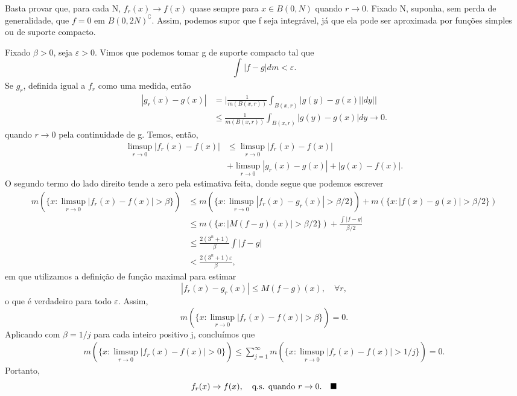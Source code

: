 \documentclass[MeasureTheory/measure_theory.tex]{subfiles}
\begin{document}
\begin{proof*}
	Basta provar que, para cada N, \(f_{r}(x)\to f(x)\) quase sempre para \(x\in B(0, N)\) quando \(r\to 0.\) Fixado N, suponha, sem perda de generalidade, que \(f = 0\) em \(B(0, 2N)^{\complement}\).
	Assim, podemos supor que f seja integrável, já que ela pode ser aproximada por funções simples ou de suporte compacto.

	Fixado \(\beta > 0\), seja \(\varepsilon > 0\). Vimos que podemos tomar g de suporte compacto tal que
	\[
		\int_{}|f-g| dm < \varepsilon .
	\]
	Se \(g_r\), definida igual a \(f_r\) como uma medida, então
	\begin{align*}
		|g_r(x) - g(x)| & = \biggl\vert \frac{1}{m(B(x, r))} \int_{B(x, r)}^{}|g(y) - g(x)||dy|\biggr\vert \\
		                & \leq \frac{1}{m(B(x, r))}\int_{B(x, r)}^{}|g(y)-g(x)|dy\to 0.
	\end{align*}
	quando \(r\to 0\) pela continuidade de g. Temos, então,
	\begin{align*}
		\limsup_{r\to 0}|f_r(x) - f(x)| & \leq \limsup_{r\to 0}|f_r(x) - f(x)|               \\
		                                & + \limsup_{r\to 0}|g_r(x) - g(x)| + |g(x) - f(x)|.
	\end{align*}
	O segundo termo do lado direito tende a zero pela estimativa feita, donde segue que podemos escrever
	\begin{align*}
		m(\{x:\limsup_{r\to 0}|f_r(x) - f(x)| > \beta \}) & \leq m(\{x:\limsup_{r\to 0}|f_r(x) - g_r(x)|>\beta /2\}) + m(\{x: |f(x)-g(x)| > \beta/2\}) \\
		                                                  & \leq m(\{x: |M(f-g)(x)|>\beta /2\}) + \frac{\int_{}^{}|f-g|}{\beta/2}                      \\
		                                                  & \leq \frac{2(3^{n}+1)}{\beta }\int_{}^{}|f-g|                                              \\
		                                                  & < \frac{2(3^{n}+1)\varepsilon }{\beta },
	\end{align*}
	em que utilizamos a definição de função maximal para estimar
	\[
		|f_r(x) - g_r(x)| \leq M(f-g)(x),\quad \forall r,
	\]
	o que é verdadeiro para todo \(\varepsilon \). Assim,
	\[
		m(\{x:\limsup_{r\to 0}|f_r(x) - f(x)| > \beta \}) = 0.
	\]
	Aplicando com \(\beta  = 1/j\) para cada inteiro positivo j, concluímos que
	\begin{align*}
		m(\{x:\limsup_{r\to 0}|f_r(x)-f(x)| > 0\}) \leq \sum\limits_{j=1}^{\infty}m(\{x:\limsup_{r\to 0}|f_r(x) - f(x)| > 1/j\}) = 0.
	\end{align*}
	Portanto,
	\[
		f_r(x)\to f(x),\quad \text{q.s. quando }r\to 0.\quad \text{$\blacksquare$}
	\]
\end{proof*}
\end{document}
